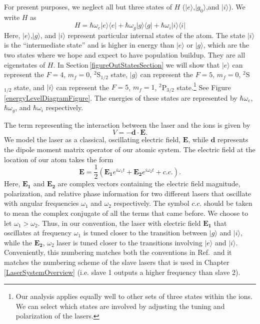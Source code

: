 For present purposes, we neglect all but three states of $H$ ($|e\rangle$,$|g_0\rangle$,and $|i\rangle$). We write $H$ as 
\begin{equation}
H=
\hbar\omega_e |e\rangle\langle e | +
\hbar\omega_g |g\rangle\langle g | +
\hbar\omega_i |i\rangle\langle i | 
\end{equation}
Here, $|e\rangle$,$|g\rangle$, and $|i\rangle$ represent particular internal states of the atom. The state $|i\rangle$ is the ``intermediate state'' and is higher in energy than $|e\rangle$ or $|g\rangle$, which are the two states where we hope and expect to have population buildup. They are all eigenstates of $H$. In Section\,\ref{figureOutStatesSection} we will show that $|e\rangle$ can represent the $F=4$, $m_f=0$, $^2$S$_{1/2}$ state, $|g\rangle$ can represent the $F=5$, $m_f=0$, $^2$S$_{1/2}$ state, and $|i\rangle$ can represent the $F=5$, $m_f=1$, $^2$P$_{3/2}$ state.\footnote{Our analysis applies equally well to other sets of three states within the ions. We can select which states are involved by adjusting the tuning and polarization of the lasers.} See Figure\,\ref{energyLevelDiagramFigure}. The energies of these states are represented by $\hbar\omega_e$, $\hbar\omega_g$, and $\hbar\omega_i$ respectively. 

The term representing the interaction between the laser and the ions is given by
\begin{equation}
V=-\mathbf{d}\cdot\mathbf{E}.
\end{equation}
We model the laser as a classical, oscillating electric field, $\mathbf{E}$, while $\mathbf{d}$ represents the dipole moment matrix operator of our atomic system. The electric field at the location of our atom takes the form 
\begin{equation}
\mathbf{E}=\frac{1}{2}\left(\mathbf{E_1} e^{i\omega_1 t} + \mathbf{E_2} e^{i\omega_2 t} + c.c. \right). \label{eqn:Efield}
\end{equation}
Here, $\mathbf{E_1}$ and $\mathbf{E_2}$ are complex vectors containing the electric field magnitude, polarization, and relative phase information for two different lasers that oscillate with angular frequencies $\omega_1$ and $\omega_2$ respectively. The symbol $c.c.$ should be taken to mean the complex conjugate of all the terms that came before. We choose to let $\omega_1>\omega_2$. 
Thus, in our convention, the laser with electric field $\mathbf{E_1}$ that oscillates at frequency $\omega_1$ is tuned closer to the transition between $|g\rangle$ and $|i\rangle$, while the $\mathbf{E_2}$, $\omega_2$ laser is tuned closer to the transitions involving $|e\rangle$ and $|i\rangle$. Conveniently, this numbering matches both the conventions in Ref.\,\cite{Young1997363} and it matches the numbering scheme of the slave lasers that is used in Chapter\,\ref{LaserSystemOverview} (i.e. slave 1 outputs a higher frequency than slave 2). 

